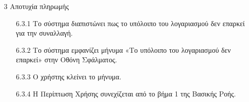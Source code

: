 \documentclass[12pt,a4paper,twoside]{book}
\begin{document}
\begin{enumerate}
\begin{enumerate}
        \end{enumerate}
  \item[3 ] Αποτυχία πληρωμής %
        \begin{enumerate}
          \item[6.3.1 ] Το σύστημα διαπιστώνει πως το υπόλοιπο του λογαριασμού δεν επαρκεί για την συναλλαγή. %
          \item[6.3.2 ] Το σύστημα εμφανίζει μήνυμα «Το υπόλοιπο του λογαριασμού δεν επαρκεί» στην Οθόνη Σφάλματος. %
          \item[6.3.3 ] Ο χρήστης κλείνει το μήνυμα. %
          \item[6.3.4 ] Η Περίπτωση Χρήσης συνεχίζεται από το βήμα 1 της Βασικής Ροής. %
        \end{enumerate}

\end{enumerate}
\end{document}
